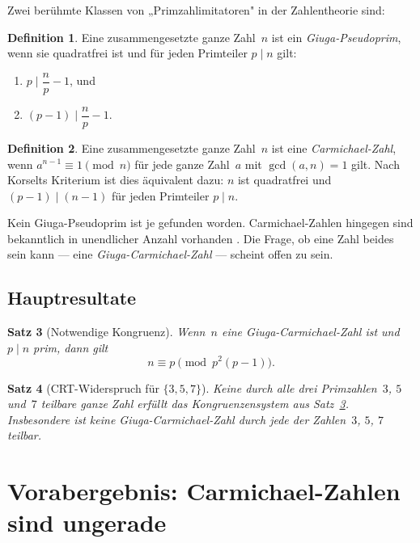 \documentclass[12pt,a4paper]{amsart}
\newtheorem{theorem}{Satz}[section]
\theoremstyle{definition}
\newtheorem{definition}[theorem]{Definition}
\begin{document}
Zwei berühmte Klassen von „Primzahlimitatoren" in der Zahlentheorie sind:

\begin{definition}
Eine zusammengesetzte ganze Zahl~$n$ ist ein \emph{Giuga-Pseudoprim}, wenn sie quadratfrei
ist und für jeden Primteiler $p \mid n$ gilt:
\begin{enumerate}
  \item[(S)] $p \mid \dfrac{n}{p} - 1$, \quad und
  \item[(St)] $(p-1) \mid \dfrac{n}{p} - 1$.
\end{enumerate}
\end{definition}

\begin{definition}
Eine zusammengesetzte ganze Zahl~$n$ ist eine \emph{Carmichael-Zahl}, wenn
$a^{n-1} \equiv 1 \pmod{n}$ für jede ganze Zahl~$a$ mit $\gcd(a, n) = 1$ gilt.
Nach Korselts Kriterium \cite{Korselt1899} ist dies äquivalent dazu:
$n$ ist quadratfrei und $(p-1) \mid (n-1)$ für jeden Primteiler $p \mid n$.
\end{definition}

Kein Giuga-Pseudoprim ist je gefunden worden. Carmichael-Zahlen hingegen sind bekanntlich
in unendlicher Anzahl vorhanden \cite{Alford1994}. Die Frage, ob eine Zahl beides sein
kann — eine \emph{Giuga-Carmichael-Zahl} — scheint offen zu sein.

\subsection{Hauptresultate}

\begin{theorem}[Notwendige Kongruenz]
\label{thm:kongruenz}
Wenn~$n$ eine Giuga-Carmichael-Zahl ist und $p \mid n$ prim, dann gilt
\[
  n \equiv p \pmod{p^2(p-1)}.
\]
\end{theorem}

\begin{theorem}[CRT-Widerspruch für $\{3, 5, 7\}$]
\label{thm:crt357}
Keine durch alle drei Primzahlen~$3$, $5$ und~$7$ teilbare ganze Zahl erfüllt
das Kongruenzensystem aus Satz~\ref{thm:kongruenz}.
Insbesondere ist keine Giuga-Carmichael-Zahl durch jede der Zahlen~$3$, $5$, $7$ teilbar.
\end{theorem}

\section{Vorabergebnis: Carmichael-Zahlen sind ungerade}
\label{sec:ungerade}
\end{document}
